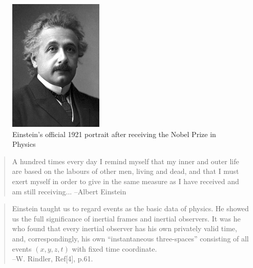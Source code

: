 \begin{figure}[H]
\centering
\includegraphics[scale=1]{src/images/lbk-graphics/portraits/einstein-nobel-prize}
\caption*{Einstein's official 1921 portrait after receiving the Nobel Prize in Physics}
\end{figure}
\begin{small}
\begin{quote}
A hundred times every day I remind myself that my inner and 
outer life are based on the labours of other men, living and 
dead, and that I must exert myself in order to give in the 
same measure as I have received and am still receiving... 
\dm \hfill --Albert Einstein 
\end{quote}




\begin{quote} 
Einstein taught us to regard events as the basic 
data of physics. He showed us the full significance of 
inertial frames and inertial observers. It was he who found 
that every inertial observer has his own privately  valid 
time, and, correspondingly, his  own ``instantaneous 
three-spaces'' consisting of all events $(x,y,z,t)$ with 
fixed time coordinate.\\\hfill--W. Rindler, Ref[4], p.61. 
\end{quote}
\end{small}

\newpage
